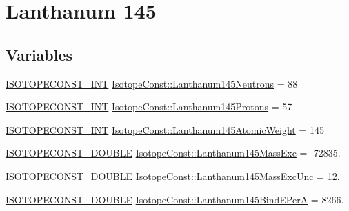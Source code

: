 \hypertarget{group___isotope_const-_lanthanum-_la145}{}\section{Lanthanum 145}
\label{group___isotope_const-_lanthanum-_la145}
\subsection*{Variables}
\begin{DoxyCompactItemize}
\item 
\mbox{\hyperlink{group___isotope_const-_macros_ga5f18360b3e99483a35c32d789e62621c}{I\+S\+O\+T\+O\+P\+E\+C\+O\+N\+S\+T\+\_\+\+I\+NT}} \mbox{\hyperlink{group___isotope_const-_lanthanum-_la145_gabefbd59f7b189c46d23d5d80e6d33b7a}{Isotope\+Const\+::\+Lanthanum145\+Neutrons}} = 88
\item 
\mbox{\hyperlink{group___isotope_const-_macros_ga5f18360b3e99483a35c32d789e62621c}{I\+S\+O\+T\+O\+P\+E\+C\+O\+N\+S\+T\+\_\+\+I\+NT}} \mbox{\hyperlink{group___isotope_const-_lanthanum-_la145_gae47b2f7d2268c7a0b7ec2d30a9393a33}{Isotope\+Const\+::\+Lanthanum145\+Protons}} = 57
\item 
\mbox{\hyperlink{group___isotope_const-_macros_ga5f18360b3e99483a35c32d789e62621c}{I\+S\+O\+T\+O\+P\+E\+C\+O\+N\+S\+T\+\_\+\+I\+NT}} \mbox{\hyperlink{group___isotope_const-_lanthanum-_la145_ga9c5a90a1d7aae029121b83b9047f1124}{Isotope\+Const\+::\+Lanthanum145\+Atomic\+Weight}} = 145
\item 
\mbox{\hyperlink{group___isotope_const-_macros_ga8f45a7272ce02c0b4c65c44636ed719a}{I\+S\+O\+T\+O\+P\+E\+C\+O\+N\+S\+T\+\_\+\+D\+O\+U\+B\+LE}} \mbox{\hyperlink{group___isotope_const-_lanthanum-_la145_ga61fdf1b9a7361e85974892bcbf36e584}{Isotope\+Const\+::\+Lanthanum145\+Mass\+Exc}} = -\/72835.
\item 
\mbox{\hyperlink{group___isotope_const-_macros_ga8f45a7272ce02c0b4c65c44636ed719a}{I\+S\+O\+T\+O\+P\+E\+C\+O\+N\+S\+T\+\_\+\+D\+O\+U\+B\+LE}} \mbox{\hyperlink{group___isotope_const-_lanthanum-_la145_ga3223973a146f6de413c3912c32f35327}{Isotope\+Const\+::\+Lanthanum145\+Mass\+Exc\+Unc}} = 12.
\item 
\mbox{\hyperlink{group___isotope_const-_macros_ga8f45a7272ce02c0b4c65c44636ed719a}{I\+S\+O\+T\+O\+P\+E\+C\+O\+N\+S\+T\+\_\+\+D\+O\+U\+B\+LE}} \mbox{\hyperlink{group___isotope_const-_lanthanum-_la145_ga75eb2038a90254c0fceabd37b1684d67}{Isotope\+Const\+::\+Lanthanum145\+Bind\+E\+PerA}} = 8266.
\item 

\end{DoxyCompactItemize}
